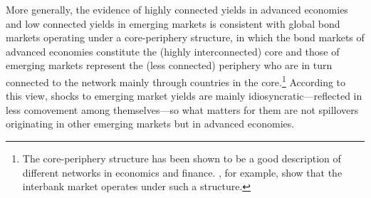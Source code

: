 \begin{appendices}
More generally, the evidence of highly connected yields in advanced economies and low connected yields in emerging markets %
is consistent with %
global bond markets operating under a core-periphery structure, in which the bond markets of advanced economies constitute the (highly interconnected) core and those of emerging markets represent the (less connected) periphery who are in turn connected to the network mainly through countries in the core.\footnote{ The core-periphery structure has been shown to be a good description of different networks in economics and finance. \cite{CvP:2014}, for example, show that the interbank market operates under such a structure.}
According to this view, shocks to emerging market yields are mainly idiosyncratic---reflected in less comovement among themselves---so
what matters for them %
are not spillovers originating in other emerging markets but in advanced economies.


\end{appendices}
